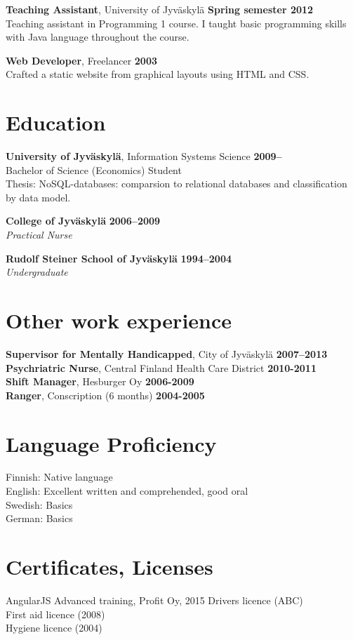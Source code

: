 \documentclass[margin,line]{resume}
\begin{document}
\begin{resume}
\textbf{Teaching Assistant}, University of Jyväskylä  
\hfill\textbf{Spring semester 2012}\\
Teaching assistant in Programming 1 course. I taught basic programming skills with Java language throughout the course.

\textbf{Web Developer}, Freelancer
\hfill\textbf{2003}\\
Crafted a static website from graphical layouts using HTML and CSS.

\section{\mysidestyle Education}

\textbf{University of Jyväskylä}, Information Systems Science \hfill \textbf{2009--} \\
Bachelor of Science (Economics) Student \\
Thesis: NoSQL-databases: comparsion to relational databases and classification by data model.

\textbf{College of Jyväskylä} \hfill \textbf{ 2006--2009}\\
\textsl{Practical Nurse} 

\textbf{Rudolf Steiner School of Jyväskylä} \hfill \textbf{1994--2004}\\
\textsl{Undergraduate} 

\section{\mysidestyle Other work experience}
\textbf{Supervisor for Mentally Handicapped}, City of Jyväskylä \hfill\textbf{2007--2013}\\
\textbf{Psychriatric Nurse}, Central Finland Health Care District
\hfill\textbf{2010-2011}\\
\textbf{Shift Manager}, Hesburger Oy \hfill\textbf{2006-2009}\\
\textbf{Ranger}, Conscription (6 months) \hfill\textbf{2004-2005} 
\pagebreak 
  
\section{\mysidestyle Language Proficiency}
Finnish: Native language \\ 
English: Excellent written and comprehended, good oral \\ 
Swedish: Basics \\ 
German: Basics 

\section{\mysidestyle Certificates, Licenses} 
AngularJS Advanced training, Profit Oy, 2015
Drivers licence (ABC) \\
First aid licence (2008) \\
Hygiene licence (2004) \\

\end{resume}
\end{document}
